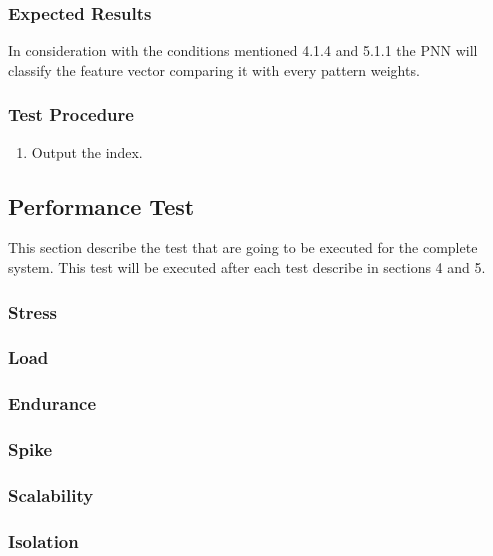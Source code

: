 \documentclass[12pt]{article}
\begin{document}
\subsubsection{Expected Results}
In consideration with the conditions mentioned 4.1.4 and 5.1.1 the PNN will classify the feature vector comparing it with every pattern weights.

\subsubsection{Test Procedure}
\begin{enumerate}
  \item Output the index.
  \end{enumerate}
\subsection{Performance Test}
This section describe the test that are going to be executed for the complete system. This test will be executed after each test describe in sections 4 and 5.

\subsubsection{Stress}
\subsubsection{Load}
\subsubsection{Endurance}
\subsubsection{Spike}
\subsubsection{Scalability}
\subsubsection{Isolation}
\end{document}
